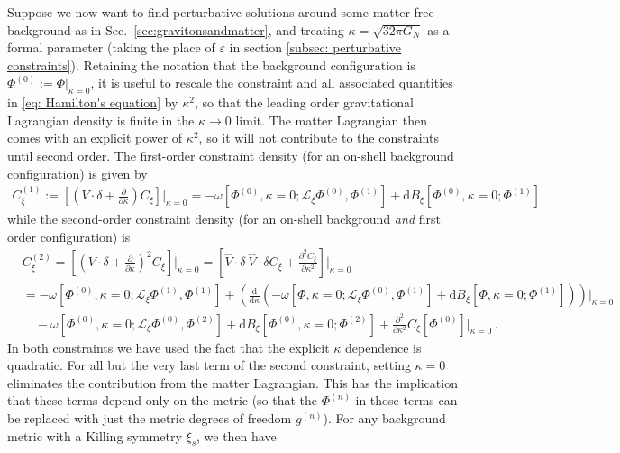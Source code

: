 \documentclass[]{jkpaper}
\theoremstyle{plain}
\theoremstyle{definition}
\newcommand{\fins}{\cdot}
\newcommand{\sd}{\mathrm {d}}
\def\extd{\mathrm {d}}
\newcommand{\fd}{\delta}
\newcommand{\sL}{\mathcal{L}}
\begin{document}
Suppose we now want to find perturbative solutions around some matter-free background as in Sec.~\ref{sec:gravitonsandmatter}, and treating $\kappa=\sqrt{32\pi G_N}$ as a formal parameter (taking the place of $\varepsilon$ in section \ref{subsec: perturbative constraints}).
Retaining the notation that the background configuration is $\Phi^{(0)}:=\Phi|_{\kappa=0}$, it is useful to rescale the constraint and all associated quantities in \eqref{eq: Hamilton's equation} by $\kappa^2$, so that the leading order gravitational Lagrangian density is finite in the $\kappa\rightarrow 0$ limit. The matter Lagrangian then comes with an explicit power of $\kappa^2$, so it will not contribute to the constraints until second order. The first-order constraint density (for an on-shell background configuration) is given by
\begin{equation}\begin{split}
    C^{(1)}_\xi:=\left[\left(V\fins\fd+\frac{\partial}{\partial\kappa}\right)C_\xi\right]\bigg|_{\kappa=0}
     = -\omega\left[\Phi^{(0)},\kappa=0;\sL_\xi\Phi^{(0)}, \Phi^{(1)}\right]+ \sd B_{\xi}\left[\Phi^{(0)},\kappa=0; \Phi^{(1)}\right]
\end{split}\end{equation}
while the second-order constraint density (for an on-shell background \textit{and} first order configuration) is
\begin{equation}\begin{split}\label{eq: second order constraint, diffeo app}
     &C_\xi^{(2)}
      =\left[\left(V\fins\fd+\frac{\partial}{\partial\kappa}\right)^2C_\xi\right]\bigg|_{\kappa=0}
      =\left[\hat{V}\fins\fd~ \hat{V}\fins\fd C_\xi+\frac{\partial^2 C_\xi}{\partial\kappa^2}\right]\bigg|_{\kappa=0}\\
      &
      =
      -\omega\left[\Phi^{(0)},\kappa=0;\sL_\xi\Phi^{(1)},\Phi^{(1)}\right]
      +\left(\frac{\extd}{\extd\kappa}\left(
      - \omega\left[\Phi,\kappa=0; \sL_\xi\Phi^{(0)},\Phi^{(1)}\right]
      +\sd B_\xi\left[\Phi,\kappa=0;\Phi^{(1)}\right]
      \right)\right)\bigg|_{\kappa=0}
      \\
      &\quad
      -\omega\left[\Phi^{(0)},\kappa=0;\sL_\xi\Phi^{(0)},\Phi^{(2)}\right]
      +\sd B_\xi\left[\Phi^{(0)},\kappa=0;\Phi^{(2)}\right]+\frac{\partial^2}{\partial\kappa^2}C_\xi[\Phi^{(0)}]\bigg|_{\kappa=0}\,.
\end{split}\end{equation}
In both constraints we have used the fact that the explicit $\kappa$ dependence is quadratic.  For all but the very last term of the second constraint, setting $\kappa=0$ eliminates the contribution from the matter Lagrangian.  This has the implication that these terms depend only on the metric (so that the $\Phi^{(n)}$ in those terms can be replaced with just the metric degrees of freedom $g^{(n)}$). For any background metric with a Killing symmetry $\xi_s$, we then have
\end{document}
